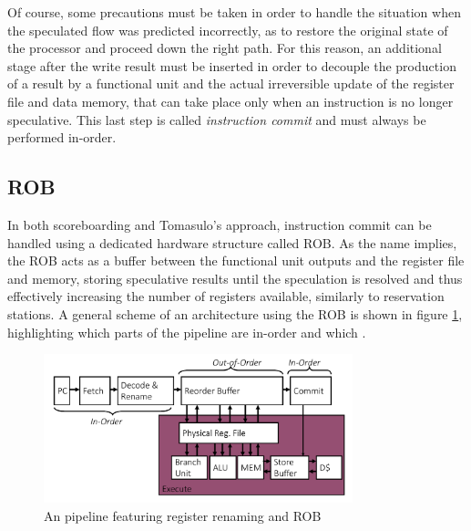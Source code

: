Of course, some precautions must be taken in order to handle the situation when the speculated flow was predicted incorrectly, as to restore the original state of the processor and proceed down the right path. For this reason, an additional stage after the write result must be inserted in order to decouple the production of a result by a functional unit and the actual irreversible update of the register file and data memory, that can take place only when an instruction is no longer speculative. This last step is called \emph{instruction commit} and must always be performed in-order.

\subsection{\acl{ROB}}
In both scoreboarding and Tomasulo's approach, instruction commit can be handled using a dedicated hardware structure called \ac{ROB}. As the name implies, the \ac{ROB} acts as a buffer between the functional unit outputs and the register file and memory, storing speculative results until the speculation is resolved and thus effectively increasing the number of registers available, similarly to reservation stations. A general scheme of an architecture using the \ac{ROB} is shown in figure \ref{fig:robpipe}, highlighting which parts of the pipeline are in-order and which \ooo.
\begin{figure}[hbtp]
  \centering
  \includegraphics[width=0.8\textwidth]{img/robpipe.pdf}
  \caption{An \ooo pipeline featuring register renaming and \acs{ROB}}
  \label{fig:robpipe}
\end{figure}


